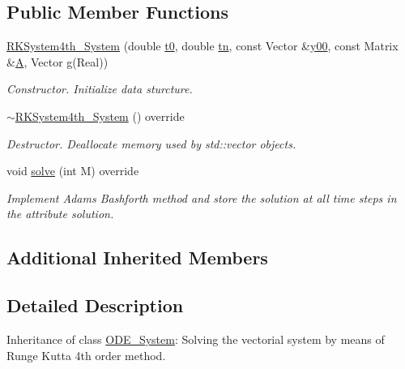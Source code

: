 \subsection*{Public Member Functions}
\begin{DoxyCompactItemize}
\item 
\mbox{\label{class_r_k_system4th___system_a210c6dffcbc9e862eb79f7c8b883a0ae}} 
\mbox{\hyperlink{class_r_k_system4th___system_a210c6dffcbc9e862eb79f7c8b883a0ae}{R\+K\+System4th\+\_\+\+System}} (double \mbox{\hyperlink{class_o_d_e___system_a1947b357608babc98c5e79d645e24c3c}{t0}}, double \mbox{\hyperlink{class_o_d_e___system_a5c5a0dd9f04dfb8d8a84d49b741773af}{tn}}, const Vector \&\mbox{\hyperlink{class_o_d_e___system_a1379137a4480e5861fd1911bc061f908}{y00}}, const Matrix \&\mbox{\hyperlink{class_o_d_e___system_a632009677e80b62a1996e842398bf8b6}{A}}, Vector \mbox{\hyperlink{class_o_d_e___system_a2dee2a4b3468547c3ddab15edfc8ddfd}{g}}(Real))
\begin{DoxyCompactList}\small\item\em Constructor. Initialize data sturcture. \end{DoxyCompactList}\item 
\mbox{\label{class_r_k_system4th___system_aae823a4345fcf79cde38b100e473346f}} 
\mbox{\hyperlink{class_r_k_system4th___system_aae823a4345fcf79cde38b100e473346f}{$\sim$\+R\+K\+System4th\+\_\+\+System}} () override
\begin{DoxyCompactList}\small\item\em Destructor. Deallocate memory used by std\+::vector objects. \end{DoxyCompactList}\item 
void \mbox{\hyperlink{class_r_k_system4th___system_ae36715c58bf1afc191394185f36eb611}{solve}} (int M) override
\begin{DoxyCompactList}\small\item\em Implement Adams Bashforth method and store the solution at all time steps in the attribute solution. \end{DoxyCompactList}\end{DoxyCompactItemize}
\subsection*{Additional Inherited Members}


\subsection{Detailed Description}
Inheritance of class \mbox{\hyperlink{class_o_d_e___system}{O\+D\+E\+\_\+\+System}}\+: Solving the vectorial system by means of Runge Kutta 4th order method. 

